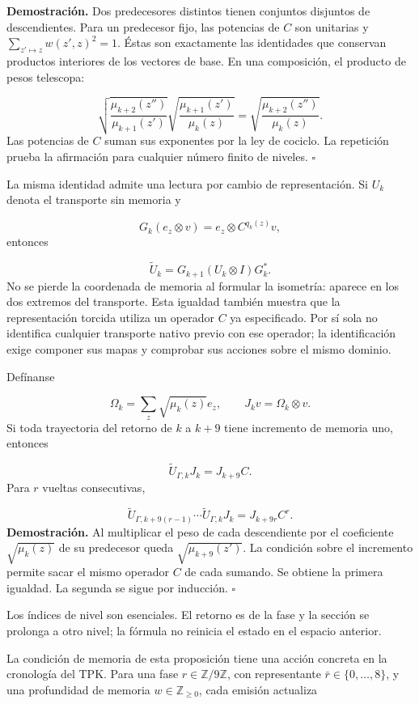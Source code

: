\textbf{Demostración.} Dos predecesores distintos tienen conjuntos disjuntos de descendientes. Para un predecesor fijo, las potencias de \(C\) son unitarias y \(\sum_{z'\mapsto z}w(z',z)^2=1\). Éstas son exactamente las identidades que conservan productos interiores de los vectores de base. En una composición, el producto de pesos telescopa:

\[
\sqrt{\frac{\mu_{k+2}(z'')}{\mu_{k+1}(z')}}
\sqrt{\frac{\mu_{k+1}(z')}{\mu_k(z)}}
=\sqrt{\frac{\mu_{k+2}(z'')}{\mu_k(z)}}.
\]
Las potencias de \(C\) suman sus exponentes por la ley de cociclo. La repetición prueba la afirmación para cualquier número finito de niveles. \hfill\(\square\)

La misma identidad admite una lectura por cambio de representación. Si \(U_k\) denota el transporte sin memoria y

\[
G_k(e_z\otimes v)=e_z\otimes C^{q_k(z)}v,
\]
entonces

\[
\widetilde U_k=G_{k+1}(U_k\otimes I)G_k^*.
\]
No se pierde la coordenada de memoria al formular la isometría: aparece en los dos extremos del transporte. Esta igualdad también muestra que la representación torcida utiliza un operador \(C\) ya especificado. Por sí sola no identifica cualquier transporte nativo previo con ese operador; la identificación exige componer sus mapas y comprobar sus acciones sobre el mismo dominio.

Defínanse

\[
\Omega_k=\sum_z\sqrt{\mu_k(z)}e_z,\qquad
J_kv=\Omega_k\otimes v.
\]
Si toda trayectoria del retorno de \(k\) a \(k+9\) tiene incremento de memoria uno, entonces

\[
\widetilde U_{\Gamma,k}J_k=J_{k+9}C.
\]
Para \(r\) vueltas consecutivas,

\[
\widetilde U_{\Gamma,k+9(r-1)}\cdots
\widetilde U_{\Gamma,k}J_k=J_{k+9r}C^r.
\]
\textbf{Demostración.} Al multiplicar el peso de cada descendiente por el coeficiente \(\sqrt{\mu_k(z)}\) de su predecesor queda \(\sqrt{\mu_{k+9}(z')}\). La condición sobre el incremento permite sacar el mismo operador \(C\) de cada sumando. Se obtiene la primera igualdad. La segunda se sigue por inducción. \hfill\(\square\)

Los índices de nivel son esenciales. El retorno es de la fase y la sección se prolonga a otro nivel; la fórmula no reinicia el estado en el espacio anterior.

La condición de memoria de esta proposición tiene una acción concreta en la cronología del TPK. Para una fase \(r\in\mathbb Z/9\mathbb Z\), con representante \(\bar r\in\{0,\ldots,8\}\), y una profundidad de memoria \(w\in\mathbb Z_{\geq0}\), cada emisión actualiza

